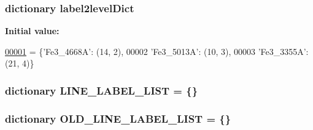 \hypertarget{namespacepyneb_1_1utils_1_1init_a4095c9ea31cb082d2a7edae4b74bd55b}{
\subsubsection[{label2level\-Dict}]{\setlength{\rightskip}{0pt plus 5cm}dictionary label2level\-Dict}}\label{namespacepyneb_1_1utils_1_1init_a4095c9ea31cb082d2a7edae4b74bd55b}
{\bfseries Initial value\-:}
\begin{DoxyCode}
\hypertarget{namespacepyneb_1_1utils_1_1init_l00001}{}\hyperlink{namespacepyneb_1_1utils_1_1init}{00001} = \{\textcolor{stringliteral}{'Fe3\_4668A'}: (14, 2), 
00002                    \textcolor{stringliteral}{'Fe3\_5013A'}: (10, 3),
00003                    \textcolor{stringliteral}{'Fe3\_3355A'}: (21, 4)\}
\end{DoxyCode}
\hypertarget{namespacepyneb_1_1utils_1_1init_a2819312869609a6e39b7c8ebd4d1e718}{
\subsubsection[{L\-I\-N\-E\-\_\-\-L\-A\-B\-E\-L\-\_\-\-L\-I\-S\-T}]{\setlength{\rightskip}{0pt plus 5cm}dictionary L\-I\-N\-E\-\_\-\-L\-A\-B\-E\-L\-\_\-\-L\-I\-S\-T = \{\}}}\label{namespacepyneb_1_1utils_1_1init_a2819312869609a6e39b7c8ebd4d1e718}
\hypertarget{namespacepyneb_1_1utils_1_1init_a73f9a0a6cbae574488d50a7af6fbfa1d}{
\subsubsection[{O\-L\-D\-\_\-\-L\-I\-N\-E\-\_\-\-L\-A\-B\-E\-L\-\_\-\-L\-I\-S\-T}]{\setlength{\rightskip}{0pt plus 5cm}dictionary O\-L\-D\-\_\-\-L\-I\-N\-E\-\_\-\-L\-A\-B\-E\-L\-\_\-\-L\-I\-S\-T = \{\}}}\label{namespacepyneb_1_1utils_1_1init_a73f9a0a6cbae574488d50a7af6fbfa1d}
